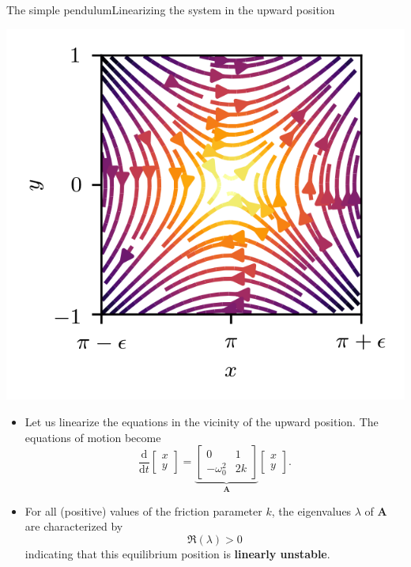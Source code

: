 \documentclass[usenames,dvipsnames,svgnames,10pt,aspectratio=169]{beamer}
\begin{document}
\begin{frame}[t, c]{The simple pendulum}{Linearizing the system in the upward position}
	\begin{minipage}{.28\textwidth}
		\centering
		\includegraphics[widht=\textwidth]{pendulum_upward_stab}
	\end{minipage}%
	\hfill
	\begin{minipage}{.68\textwidth}
		\begin{itemize}
			\item Let us linearize the equations in the vicinity of the upward position.
			The equations of motion become
			\[
				\displaystyle \frac{\mathrm{d}}{\mathrm{d}t} \begin{bmatrix} x \\ y \end{bmatrix} = \underbrace{\begin{bmatrix} 0 & 1 \\ -\omega_0^2 & 2k \end{bmatrix}}_{\bm{A}} \begin{bmatrix} x \\ y \end{bmatrix}.
			\]

			\item For all (positive) values of the friction parameter \(k\), the eigenvalues \( \lambda \) of \( \bm{A} \) are characterized by
			\[
				\Re(\lambda) > 0
			\]
			indicating that this equilibrium position is \alert{\textbf{linearly unstable}}.
		\end{itemize}
	\end{minipage}

	\vspace{1cm}
\end{frame}
\end{document}
